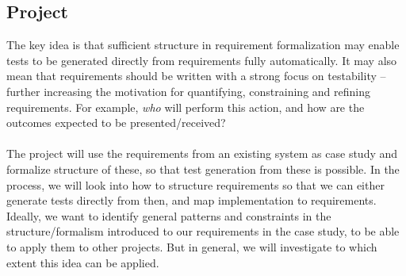 \documentclass[10pt]{scrartcl}
\begin{document}
\subsection*{Project}
The key idea is that sufficient structure in requirement formalization may enable tests to be generated directly from requirements fully automatically. It may also mean that requirements should be written with a strong focus on testability -- further increasing the motivation for quantifying, constraining and refining requirements. For example, \emph{who} will perform this action, and how are the outcomes expected to be presented/received?\\\\
The project will use the requirements from an existing system as case study and formalize structure of these, so that test generation from these is possible. In the process, we will look into how to structure requirements so that we can either generate tests directly from then, and map implementation to requirements. Ideally, we want to identify general patterns and constraints in the structure/formalism introduced to our requirements in the case study, to be able to apply them to other projects. But in general, we will investigate to which extent this idea can be applied.
\end{document}
